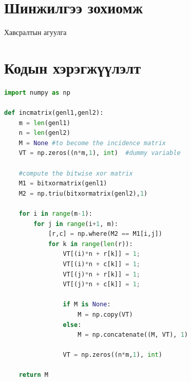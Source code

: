 \documentclass[12pt,A4]{report}
\begin{document}
\appendix
{}

\chapter{Шинжилгээ зохиомж}
Хавсралтын агуулга

\chapter{Кодын хэрэгжүүлэлт}


\begin{lstlisting}[language=Python]
import numpy as np
 
def incmatrix(genl1,genl2):
    m = len(genl1)
    n = len(genl2)
    M = None #to become the incidence matrix
    VT = np.zeros((n*m,1), int)  #dummy variable
 
    #compute the bitwise xor matrix
    M1 = bitxormatrix(genl1)
    M2 = np.triu(bitxormatrix(genl2),1) 
 
    for i in range(m-1):
        for j in range(i+1, m):
            [r,c] = np.where(M2 == M1[i,j])
            for k in range(len(r)):
                VT[(i)*n + r[k]] = 1;
                VT[(i)*n + c[k]] = 1;
                VT[(j)*n + r[k]] = 1;
                VT[(j)*n + c[k]] = 1;
 
                if M is None:
                    M = np.copy(VT)
                else:
                    M = np.concatenate((M, VT), 1)
 
                VT = np.zeros((n*m,1), int)
 
    return M
\end{lstlisting}
\end{document}
